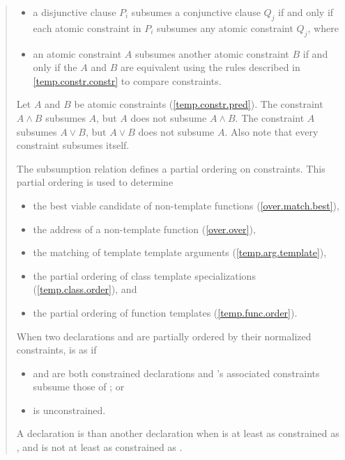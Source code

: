 \begin{quote}
\begin{itemize}
\item a disjunctive clause $P_i$ subsumes a conjunctive clause
$Q_j$ if and only if each atomic constraint in $P_i$ subsumes 
any atomic constraint $Q_j$, where

\item an atomic constraint $A$ subsumes another atomic constraint
$B$ if and only if the $A$ and $B$ are equivalent using the
rules described in \ref{temp.constr.constr} to compare constraints.
\end{itemize}
% 
\enterexample
Let $A$ and $B$ be atomic constraints (\ref{temp.constr.pred}).
% 
The constraint $A \land B$ subsumes $A$, but $A$ does not subsume $A \land B$.
% 
The constraint $A$ subsumes $A \lor B$, but $A \lor B$ does not subsume $A$.
% 
Also note that every constraint subsumes itself.
\exitexample


\pnum
The subsumption relation defines a partial ordering on constraints. 
This partial ordering is used to determine
% 
\begin{itemize}
\item the best viable candidate of non-template functions
     (\ref{over.match.best}), 
\item the address of a non-template function
     (\ref{over.over}), 
\item the matching of template template arguments
     (\ref{temp.arg.template}), 
\item the partial ordering of class template specializations
     (\ref{temp.class.order}), and
\item the partial ordering of function templates
     (\ref{temp.func.order}).
\end{itemize}

\pnum
When two declarations  and  are
partially ordered by their normalized constraints,  is 
 as  if
% 
\begin{itemize}
\item {} and  are both constrained declarations and 
's associated constraints subsume those of ; or

\item {} is unconstrained.
\end{itemize}
% 
\pnum
A declaration  is 
than another declaration  when  is at least as
constrained as , and  is not at least as
constrained as .


\end{quote}
